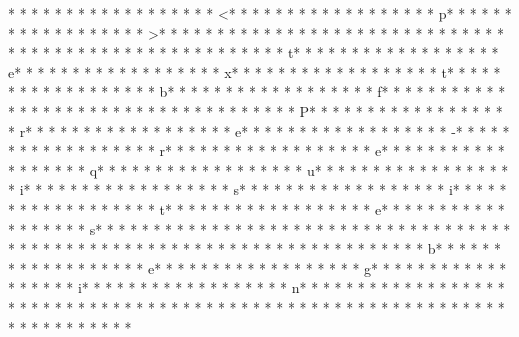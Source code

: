 * * *  * * *  * * *  *  * * *  *  * * *  * <* * *  * * *  * * *  *  * * *  *  * * *  * p* * *  * * *  * * *  *  * * *  *  * * *  * >* * *  * * *  * * *  *  * * *  *  * * *  * 
* * *  * * *  * * *  *  * * *  *  * * *  * 	* * *  * * *  * * *  *  * * *  *  * * *  * t* * *  * * *  * * *  *  * * *  *  * * *  * e* * *  * * *  * * *  *  * * *  *  * * *  * x* * *  * * *  * * *  *  * * *  *  * * *  * t* * *  * * *  * * *  *  * * *  *  * * *  * b* * *  * * *  * * *  *  * * *  *  * * *  * f* * *  * * *  * * *  *  * * *  *  * * *  * {* * *  * * *  * * *  *  * * *  *  * * *  * P* * *  * * *  * * *  *  * * *  *  * * *  * r* * *  * * *  * * *  *  * * *  *  * * *  * e* * *  * * *  * * *  *  * * *  *  * * *  * -* * *  * * *  * * *  *  * * *  *  * * *  * r* * *  * * *  * * *  *  * * *  *  * * *  * e* * *  * * *  * * *  *  * * *  *  * * *  * q* * *  * * *  * * *  *  * * *  *  * * *  * u* * *  * * *  * * *  *  * * *  *  * * *  * i* * *  * * *  * * *  *  * * *  *  * * *  * s* * *  * * *  * * *  *  * * *  *  * * *  * i* * *  * * *  * * *  *  * * *  *  * * *  * t* * *  * * *  * * *  *  * * *  *  * * *  * e* * *  * * *  * * *  *  * * *  *  * * *  * s* * *  * * *  * * *  *  * * *  *  * * *  * }* * *  * * *  * * *  *  * * *  *  * * *  * 
* * *  * * *  * * *  *  * * *  *  * * *  * 	* * *  * * *  * * *  *  * * *  *  * * *  * b* * *  * * *  * * *  *  * * *  *  * * *  * e* * *  * * *  * * *  *  * * *  *  * * *  * g* * *  * * *  * * *  *  * * *  *  * * *  * i* * *  * * *  * * *  *  * * *  *  * * *  * n* * *  * * *  * * *  *  * * *  *  * * *  * {* * *  * * *  * * *  *  * * *  *  * * *  *  * * *  * * *  * * *  *  * * *  *  * * *  * }* * *  * * *  * * *  *  * * *  *  * * *  * 
